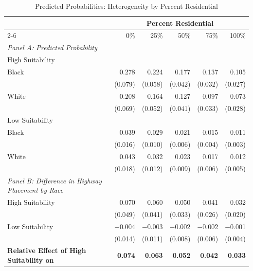 \begin{table}[h]
\centering
\caption{Predicted Probabilities: Heterogeneity by Percent Residential}
\label{tab:predicted_outcomes/suitabilityxblackshare+pctres_racediff}
\begin{threeparttable}
\begin{tabular*}{1\textwidth}{@{\extracolsep{\fill}}lr@{\hspace{1.2em}}r@{\hspace{1.2em}}r@{\hspace{1.2em}}r@{\hspace{1.2em}}r@{\hspace{1.2em}}}
\toprule
 & \multicolumn{5}{c}{Percent Residential} \\
\cmidrule(l){2-6}
 & 0\% & 25\% & 50\% & 75\% & 100\% \\
\midrule
\textit{Panel A: Predicted Probability} & & & & & \\
\addlinespace[2pt]
High Suitability & & & & & \\
\quad Black & 0.278 & 0.224 & 0.177 & 0.137 & 0.105 \\
 & (0.079) & (0.058) & (0.042) & (0.032) & (0.027) \\[4pt]
\quad White & 0.208 & 0.164 & 0.127 & 0.097 & 0.073 \\
 & (0.069) & (0.052) & (0.041) & (0.033) & (0.028) \\[4pt]
Low Suitability & & & & & \\
\quad Black & 0.039 & 0.029 & 0.021 & 0.015 & 0.011 \\
 & (0.016) & (0.010) & (0.006) & (0.004) & (0.003) \\[4pt]
\quad White & 0.043 & 0.032 & 0.023 & 0.017 & 0.012 \\
 & (0.018) & (0.012) & (0.009) & (0.006) & (0.005) \\[4pt]
\midrule
\textit{Panel B: Difference in Highway Placement by Race} & & & & & \\
\addlinespace[2pt]
High Suitability & 0.070 & 0.060 & 0.050 & 0.041 & 0.032 \\
 & (0.049) & (0.041) & (0.033) & (0.026) & (0.020) \\[4pt]
Low Suitability & $-$0.004 & $-$0.003 & $-$0.002 & $-$0.002 & $-$0.001 \\
 & (0.014) & (0.011) & (0.008) & (0.006) & (0.004) \\[4pt]
\addlinespace[2pt]
\textbf{Relative Effect of High Suitability on} & \textbf{0.074}\rlap{$^{*}$} & \textbf{0.063}\rlap{$^{*}$} & \textbf{0.052}\rlap{$^{*}$} & \textbf{0.042}\rlap{$^{*}$} & \textbf{0.033}\rlap{$^{*}$} \\

\end{tabular*}
\end{threeparttable}
\end{table}
